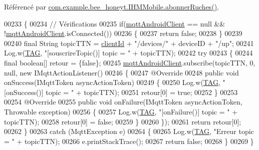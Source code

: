 Référencé par \hyperlink{_i_h_m_mobile_8java_source_l00563}{com.\+example.\+bee\+\_\+honeyt.\+I\+H\+M\+Mobile.\+abonner\+Ruches()}.


\begin{DoxyCode}
00233     \{
00234         \textcolor{comment}{// Vérifications}
00235         \textcolor{keywordflow}{if}(\hyperlink{classcom_1_1example_1_1bee__honeyt_1_1_communication_a86db63a356e4638c1d39c54bbe64f0e1}{mqttAndroidClient} == null && !\hyperlink{classcom_1_1example_1_1bee__honeyt_1_1_communication_a86db63a356e4638c1d39c54bbe64f0e1}{mqttAndroidClient}.isConnected())
00236         \{
00237             \textcolor{keywordflow}{return} \textcolor{keyword}{false};
00238         \}
00239 
00240         \textcolor{keyword}{final} String topicTTN = \hyperlink{classcom_1_1example_1_1bee__honeyt_1_1_communication_a8b44e0173d57396d5478f767723c23cc}{clientId} + \textcolor{stringliteral}{"/devices/"} + deviceID + \textcolor{stringliteral}{"/up"};
00241         Log.w(\hyperlink{classcom_1_1example_1_1bee__honeyt_1_1_communication_a848338dd9654af654c7e681742666785}{TAG}, \textcolor{stringliteral}{"[souscrireTopic()] topic = "} + topicTTN);
00242         \textcolor{keywordflow}{try}
00243         \{
00244             \textcolor{keyword}{final} \textcolor{keywordtype}{boolean}[] retour = \{\textcolor{keyword}{false}\};
00245             \hyperlink{classcom_1_1example_1_1bee__honeyt_1_1_communication_a86db63a356e4638c1d39c54bbe64f0e1}{mqttAndroidClient}.subscribe(topicTTN, 0, null, \textcolor{keyword}{new} IMqttActionListener()
00246             \{
00247                 @Override
00248                 \textcolor{keyword}{public} \textcolor{keywordtype}{void} onSuccess(IMqttToken asyncActionToken)
00249                 \{
00250                     Log.w(\hyperlink{classcom_1_1example_1_1bee__honeyt_1_1_communication_a848338dd9654af654c7e681742666785}{TAG}, \textcolor{stringliteral}{"[onSuccess()] topic = "} + topicTTN);
00251                     retour[0] = \textcolor{keyword}{true};
00252                 \}
00253 
00254                 @Override
00255                 \textcolor{keyword}{public} \textcolor{keywordtype}{void} onFailure(IMqttToken asyncActionToken, Throwable exception)
00256                 \{
00257                     Log.w(\hyperlink{classcom_1_1example_1_1bee__honeyt_1_1_communication_a848338dd9654af654c7e681742666785}{TAG}, \textcolor{stringliteral}{"[onFailure()] topic = "} + topicTTN);
00258                     retour[0] = \textcolor{keyword}{false};
00259                 \}
00260             \});
00261             \textcolor{keywordflow}{return} retour[0];
00262         \}
00263         \textcolor{keywordflow}{catch} (MqttException e)
00264         \{
00265             Log.w(\hyperlink{classcom_1_1example_1_1bee__honeyt_1_1_communication_a848338dd9654af654c7e681742666785}{TAG}, \textcolor{stringliteral}{"Erreur topic = "} + topicTTN);
00266             e.printStackTrace();
00267             \textcolor{keywordflow}{return} \textcolor{keyword}{false};
00268         \}
00269     \}
\end{DoxyCode}


